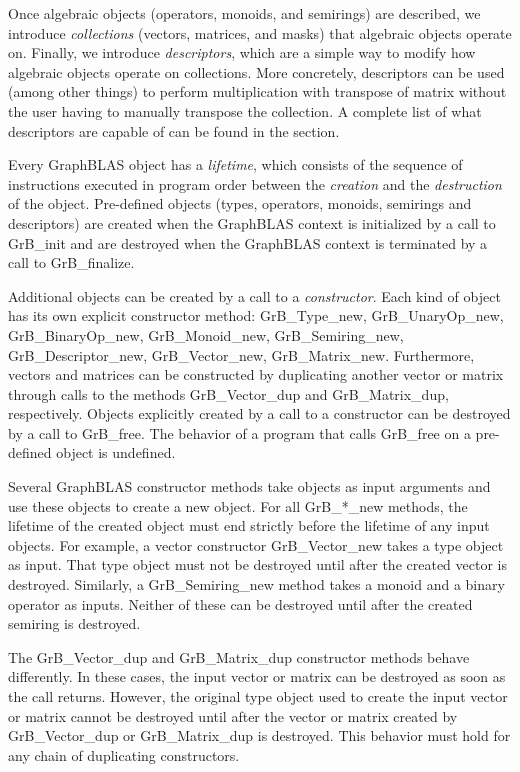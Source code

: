 Once algebraic objects (operators, monoids, and semirings) are described,
we introduce \emph{collections} (vectors, matrices, and masks) that
algebraic objects operate on. Finally, we introduce \emph{descriptors},
which are a simple way to modify how algebraic objects operate on
collections. More concretely, descriptors can be used (among other
things) to perform multiplication with transpose of matrix without the
user having to manually transpose the collection. A complete list of
what descriptors are capable of can be found in the section.

Every GraphBLAS object has a \emph{lifetime}, which consists of
the sequence of instructions executed in program order between the
\emph{creation} and the \emph{destruction} of the object.  Pre-defined
objects (types, operators, monoids, semirings and descriptors) are created
when the GraphBLAS context is initialized by a call to {\sf GrB\_init}
and are destroyed when the GraphBLAS context is terminated by a call to
{\sf GrB\_finalize}.

Additional objects can be created by a call to a \emph{constructor}.
Each kind of object has its own explicit constructor method: {\sf GrB\_Type\_new},
{\sf GrB\_UnaryOp\_new}, {\sf GrB\_BinaryOp\_new}, {\sf GrB\_Monoid\_new},
{\sf GrB\_Semiring\_new}, {\sf GrB\_Descriptor\_new}, {\sf GrB\_Vector\_new},
{\sf GrB\_Matrix\_new}. Furthermore, vectors and matrices can be
constructed by duplicating another vector or matrix through calls 
to the methods {\sf GrB\_Vector\_dup} and {\sf GrB\_Matrix\_dup}, respectively.
Objects explicitly created by a call to a constructor can be destroyed
by a call to {\sf GrB\_free}. The behavior of a program
that calls {\sf GrB\_free} on a pre-defined object is undefined.

Several GraphBLAS constructor methods take objects as input arguments
and use these objects to create a new object. For all {\sf GrB\_*\_new}
methods, the lifetime of the created object must end strictly before
the lifetime of any input objects. For example, a vector constructor
{\sf GrB\_Vector\_new} takes a type object as input. That type
object must not be destroyed until after the created vector is destroyed.
Similarly, a {\sf GrB\_Semiring\_new} method takes a monoid and
a binary operator as inputs. Neither of these can be destroyed until
after the created semiring is destroyed.

The {\sf GrB\_Vector\_dup} and {\sf GrB\_Matrix\_dup} constructor
methods behave differently. In these cases, the input vector or matrix can
be destroyed as soon as the call returns. However, the original type
object used to create the input vector or matrix cannot be destroyed
until after the vector or matrix created by {\sf GrB\_Vector\_dup} or
{\sf GrB\_Matrix\_dup} is destroyed.  This behavior must hold for any
chain of duplicating constructors.

